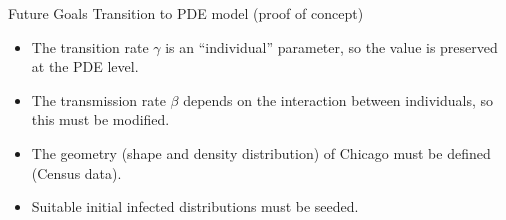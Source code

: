 \begin{slide}{Future Goals}
	{\large Transition to PDE model (proof of concept)}
	
	\vspace{.5cm}
	
	\begin{itemize}
		\item The transition rate $\gamma$ is an ``individual'' parameter, so the value is preserved at the PDE level.
		\item The transmission rate $\beta$ depends on the interaction between individuals, so this must be modified.
		
		\vspace{.3cm}
		
		\item The geometry (shape and density distribution) of Chicago must be defined (Census data).
		\item Suitable initial infected distributions must be seeded.
	\end{itemize}
\end{slide}